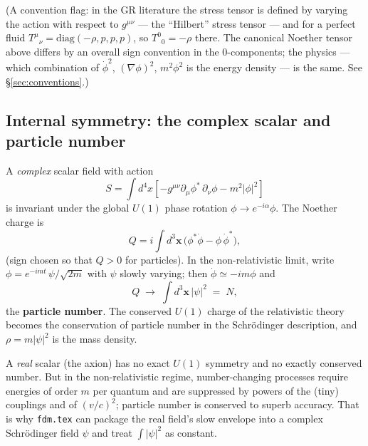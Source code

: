 \documentclass[12pt]{article}
\newcommand{\bx}{\mathbf{x}}
\begin{document}
(A convention flag: in the GR literature the stress tensor is defined
by varying the action with respect to $g^{\mu\nu}$ --- the ``Hilbert''
stress tensor --- and for a perfect fluid
$T^\mu{}_\nu = \mathrm{diag}(-\rho,p,p,p)$, so $T^0{}_0 = -\rho$
there.  The canonical Noether tensor above differs by an overall
sign convention in the $0$-components; the physics --- which
combination of $\dot\phi^2$, $(\nabla\phi)^2$, $m^2\phi^2$ is the
energy density --- is the same.  See \S\ref{sec:conventions}.)

\subsection{Internal symmetry: the complex scalar and particle number}
\label{sec:u1}

A \emph{complex} scalar field with action
%
\begin{equation}
  S = \int d^4x \left[
      -g^{\mu\nu}\partial_\mu\phi^*\,\partial_\nu\phi
      - m^2|\phi|^2 \right]
  \label{eq:complex_action}
\end{equation}
%
is invariant under the global $U(1)$ phase rotation
$\phi \to e^{-i\alpha}\phi$.  The Noether charge is
%
\begin{equation}
  Q = i\!\int d^3\bx\,
      \bigl(\phi^*\dot\phi - \phi\,\dot\phi^*\bigr),
  \label{eq:u1_charge}
\end{equation}
%
(sign chosen so that $Q>0$ for particles).  In the non-relativistic
limit, write $\phi = e^{-imt}\,\psi/\sqrt{2m}$ with $\psi$ slowly
varying; then $\dot\phi \simeq -im\phi$ and
%
\begin{equation}
  Q \;\longrightarrow\; \int d^3\bx\, |\psi|^2 \;=\; N,
\end{equation}
%
the \textbf{particle number}.  The conserved $U(1)$ charge of the
relativistic theory becomes the conservation of particle number in
the Schr\"odinger description, and $\rho = m|\psi|^2$ is the mass
density.

A \emph{real} scalar (the axion) has no exact $U(1)$ symmetry and no
exactly conserved number.  But in the non-relativistic regime,
number-changing processes require energies of order $m$ per quantum
and are suppressed by powers of the (tiny) couplings and of
$(v/c)^2$; particle number is conserved to superb accuracy.  That is
why \texttt{fdm.tex} can package the real field's slow envelope into
a complex Schr\"odinger field $\psi$ and treat $\int|\psi|^2$ as
constant.

\end{document}

